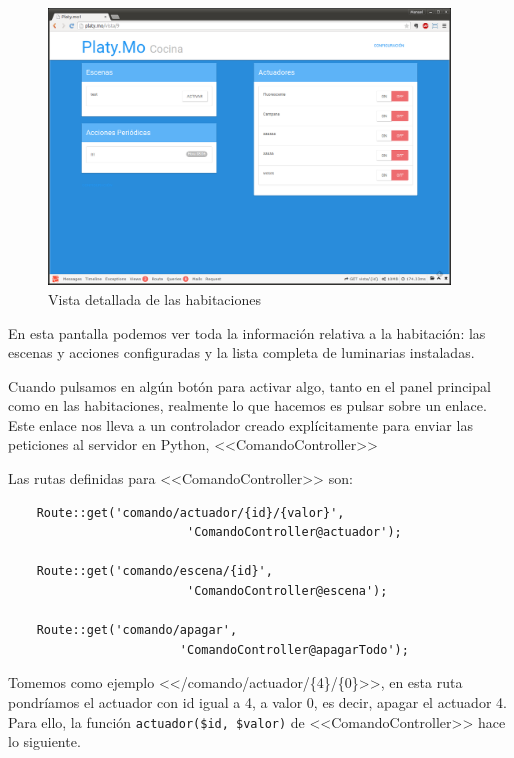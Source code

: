      \begin{figure}[htbp]
         \centering
         \includegraphics[width=0.95\textwidth]{imagenes/vista.png}
         \caption{Vista detallada de las habitaciones}
         \label{fig:vista_hab}
        \end{figure}
        
        
    En esta pantalla podemos ver toda la información relativa a la  habitación: las escenas y acciones configuradas y la lista completa de luminarias instaladas. 
    
    Cuando pulsamos en algún botón para activar algo, tanto en el panel principal como en las habitaciones, realmente lo que hacemos es pulsar sobre un enlace. Este enlace nos lleva a un controlador creado explícitamente para enviar las peticiones al servidor en Python, <<ComandoController>>
    
    Las rutas definidas para <<ComandoController>> son:
    \begin{lstlisting}
    Route::get('comando/actuador/{id}/{valor}',
                         'ComandoController@actuador');
                 
    Route::get('comando/escena/{id}',
                         'ComandoController@escena');
                 
    Route::get('comando/apagar', 
                        'ComandoController@apagarTodo');
    \end{lstlisting}
    
    Tomemos como ejemplo <</comando/actuador/\{4\}/\{0\}>>, en esta ruta pondríamos el actuador con id igual a 4, a valor 0, es decir, apagar el actuador 4. Para ello, la función \lstinline|actuador($id, $valor)| de <<ComandoController>> hace lo siguiente.
    
